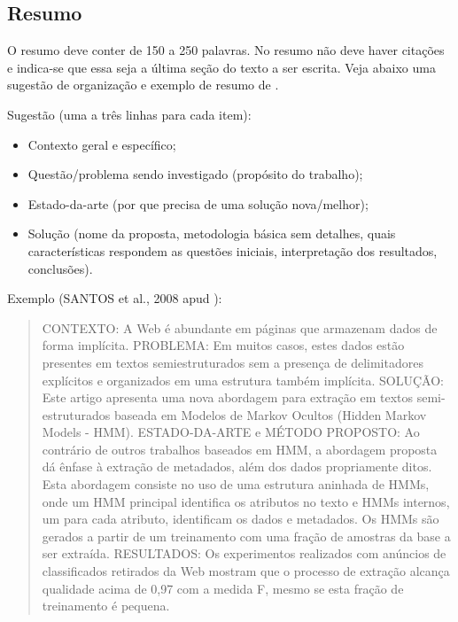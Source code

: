 \subsection{Resumo}
O resumo deve conter de 150 a 250 palavras. No resumo não deve haver citações e indica-se que essa seja a última seção do texto a ser escrita. Veja abaixo uma sugestão de organização e exemplo de resumo de .

Sugestão (uma a três linhas para cada item):
\begin{itemize}
	\item Contexto geral e específico;
	\item Questão/problema sendo investigado (propósito do trabalho);
	\item Estado-da-arte (por que precisa de uma solução nova/melhor);
	\item Solução (nome da proposta, metodologia básica sem detalhes, quais características respondem as questões iniciais, interpretação dos resultados, conclusões).
\end{itemize}

Exemplo (SANTOS et al., 2008 apud \citealp{Moro11}):
\begin{quote}
CONTEXTO: A Web é abundante em páginas que armazenam  dados de forma implícita. PROBLEMA: Em muitos casos, estes dados estão presentes em textos semiestruturados sem a presença de delimitadores explícitos e organizados em uma estrutura também implícita. SOLUÇÃO: Este artigo apresenta uma nova abordagem para extração em textos semi-estruturados baseada em Modelos de Markov Ocultos (Hidden Markov Models - HMM). ESTADO-DA-ARTE e MÉTODO PROPOSTO: Ao contrário de outros trabalhos baseados em HMM, a abordagem proposta dá ênfase à extração de metadados, além dos dados propriamente ditos. Esta abordagem consiste no uso de uma estrutura aninhada de HMMs, onde um HMM principal identifica os atributos no texto e HMMs internos, um para cada atributo, identificam os dados e metadados. Os HMMs são gerados a partir de um treinamento com uma fração de amostras da base a ser extraída. RESULTADOS: Os experimentos realizados com anúncios de classificados retirados da Web mostram que o processo de extração alcança qualidade acima de 0,97 com a medida F, mesmo se esta fração de treinamento é pequena. 
\end{quote}


